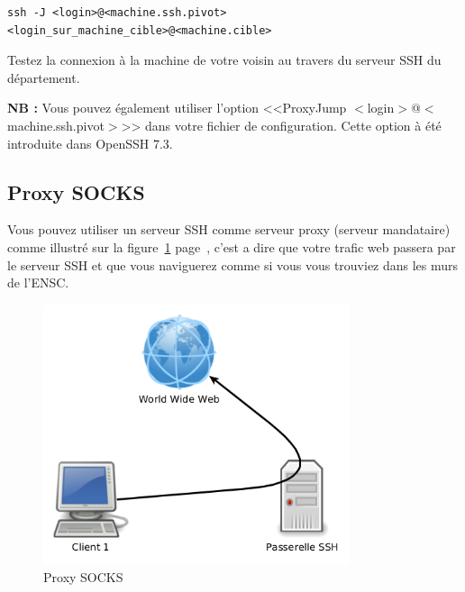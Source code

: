 \documentclass[11pt]{article}
\begin{document}
\begin{lstlisting}
ssh -J <login>@<machine.ssh.pivot> <login_sur_machine_cible>@<machine.cible>
\end{lstlisting}

Testez la connexion à la machine de votre voisin au travers du serveur SSH du département.

\textbf{NB :} Vous pouvez également utiliser l'option <<ProxyJump $<$login$>$@$<$machine.ssh.pivot$>$>> dans votre fichier de configuration. Cette option à été introduite dans OpenSSH 7.3.

\subsection{Proxy SOCKS}

Vous pouvez utiliser un serveur SSH comme serveur proxy (serveur mandataire) comme illustré sur la figure~\ref{socks} page~\pageref{socks}, c'est a dire que votre trafic web passera par le serveur SSH et que vous naviguerez comme si vous vous trouviez dans les murs de l'ENSC.\\

\begin{figure}[h]
 \centering
 \includegraphics[width=9cm]{socks}
 \caption{\label{socks}Proxy SOCKS}
\end{figure}
\end{document}
